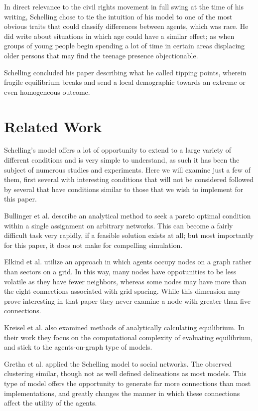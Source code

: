 \documentclass[sigplan,nonacm]{acmart}
\begin{document}
In direct relevance to the civil rights movement in full swing at the time of his writing, Schelling chose to 
tie the intuition of his model to one of the most obvious traits that could classify differences between agents,
which was race. He did write about situations in which age could have a similar effect; as when groups of young people
begin spending a lot of time in certain areas displacing older persons that may find the teenage presence objectionable.

Schelling concluded his paper describing what he called tipping points, wherein fragile equilibrium breaks and send a local
demographic towards an extreme or even homogeneous outcome.

\section{Related Work}

Schelling's model offers a lot of opportunity to extend to a large variety of different conditions
and is very simple to understand, as such it has been the subject of numerous studies and experiments.
Here we will examine just a few of them, first several with interesting conditions that will not be considered
followed by several that have conditions similar to those that we wish to implement for this paper.


Bullinger et al. \cite{Bullinger2021} describe an analytical method to seek a pareto optimal
condition within a single assignment on arbitrary networks. 
This can become a fairly difficult task very rapidly,
if a feasible solution exists at all; but most importantly for this paper,
it does not make for compelling simulation.

Elkind et al.\cite{Elkind2021} utilize an approach in which agents occupy nodes on a graph rather than sectors on a grid.
In this way, many nodes have oppotunities to be less volatile as they have fewer neighbors, whereas
some nodes may have more than the eight connections associated with grid spacing.
While this dimension may prove interesting in that paper they never examine a node with greater than five connections.

Kreisel et al. \cite{Kreisel2022} also examined methods of analytically calculating equilibrium.
In their work they focus on the computational complexity of evaluating equilibrium,
and stick to the agents-on-graph type of models.

Gretha et al.\cite{Gretha2018} applied the Schelling model to social networks. The observed clustering similar,
though not as well defined delineations as most models. This type of model offers the opportunity to generate
far more connections than most implementations, and greatly changes the manner in which these connections 
affect the utility of the agents.
\end{document}
